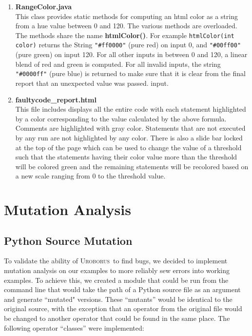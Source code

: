 \documentclass[english]{article}
\newcommand{\Uro}{\textsc{Uroborus}} \newcommand{\Taran}{\textsc{Tarantula}}
\newcommand{\fch}{\textbf{faultycode\_report.html}}
\begin{document}
\begin{enumerate}
\item \textbf{RangeColor.java} \\
        This class provides static methods for computing an html color as a string from a hue value
        between 0 and 120. The various methods are overloaded. The methods share the name
        \textbf{htmlColor()}. For example \texttt{htmlColor(int color)} returns the String
        \texttt{"\#ff0000"} (pure red) on input 0, and \texttt{"\#00ff00"} (pure green) on input 120. For all other
        inputs in between 0 and 120, a linear blend of red and green is computed. For all invalid
        inputs, the string \texttt{"\#0000ff"} (pure blue) is returned to make sure that it is clear
        from the final report that an unexpected value was passed.
        input.

\item \fch\ \\
This file includes displays all the entire code with each statement highlighted by a color
corresponding to the value calculated by the above formula. Comments are highlighted with gray
color. Statements that are not executed by any run are not highlighted by any color. There is also a
slide bar locked at the top of the page which can be used to change the value of a threshold such
that the statements having their color value more than the threshold will be colored green and the
remaining statements will be recolored based on a new scale ranging from 0 to the threshold value.

\end{enumerate}

\section{Mutation Analysis}

\subsection{Python Source Mutation}
To validate the ability of \Uro\ to find bugs, we decided to implement mutation analysis on our
examples to more reliably sew errors into working examples. To achieve this, we created a module
that could be run from the command line that would take the path of a Python source file as an
argument and generate ``mutated" versions. These ``mutants'' would be identical to the original source,
with the exception that an operator from the original file would be changed to another operator that
could be found in the same place. The following operator ``classes'' were implemented:
\end{document}
